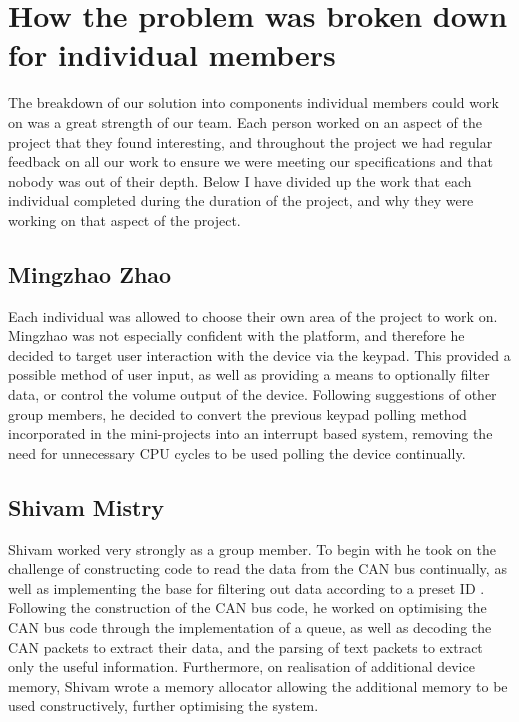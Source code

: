 \section{How the problem was broken down for individual members}

The breakdown of our solution into components individual members could work on 
was a great strength of our team. Each person worked on an aspect of the project 
that they found interesting, and throughout the project we had regular feedback 
on all our work to ensure we were meeting our specifications and 
that nobody was out of their depth. Below I have divided up the work that each 
individual completed during the duration of the project, and why they were 
working on that aspect of the project. 

\subsection*{Mingzhao Zhao}
Each individual was allowed to choose their own area of the project to work on. 
Mingzhao was not especially confident with the platform, and therefore he 
decided to target user interaction with the device via the keypad. This 
provided a possible method of user input, as well as providing a means to 
optionally filter data, or control the volume output of the device. 
Following suggestions 
of other group members, he decided to convert the previous keypad polling method 
incorporated in the mini-projects into an interrupt based system, removing the 
need for unnecessary CPU cycles to be used polling the device continually. 

\subsection*{Shivam Mistry} 
Shivam worked very strongly as a group member. To begin with he took on the 
challenge of constructing code to read the data from the CAN bus continually, 
as well as implementing the base for filtering out data according to a preset ID
. Following the construction of the CAN bus code, he worked on optimising the 
CAN bus code through the
implementation of a queue, as well as decoding the CAN packets to extract their
data, and the parsing of text packets to extract only the useful information. 
Furthermore, on realisation of additional device memory, Shivam wrote a memory 
allocator allowing the additional memory to be used constructively, further 
optimising the system. 

